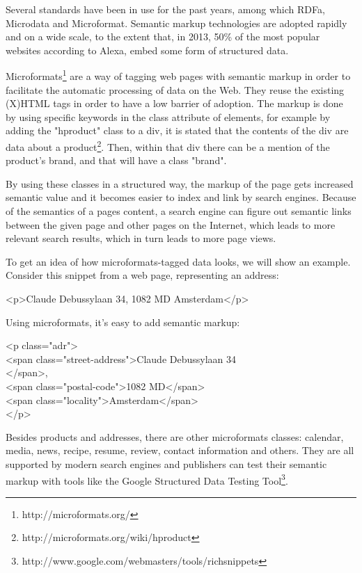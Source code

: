\documentclass{acm_proc_10ptArticle-sp}
\begin{document}
Several standards have been in use for the past years, among which RDFa, Microdata and Microformat\cite{bizer2013deployment}. Semantic markup technologies are adopted rapidly and on a wide scale, to the extent that, in 2013, 50\% of the most popular websites according to Alexa, embed some form of structured data. 

Microformats\footnote{http://microformats.org/} are a way of tagging web pages with semantic markup in order to facilitate the automatic processing of data on the Web. They reuse the existing (X)HTML tags in order to have a low barrier of adoption. The markup is done by using specific keywords in the class attribute of elements, for example by adding the "hproduct" class to a div, it is stated that the contents of the div are data about a product\footnote{http://microformats.org/wiki/hproduct}. Then, within that div there can be a mention of the product's brand, and that will have a class "brand".

By using these classes in a structured way, the markup of the page gets increased semantic value and it becomes easier to index and link by search engines. Because of the semantics of a pages content, a search engine can figure out semantic links between the given page and other pages on the Internet, which leads to more relevant search results, which in turn leads to more page views.

To get an idea of how microformats-tagged data looks, we will show an example. Consider this snippet from a web page, representing an address:

<p>Claude Debussylaan 34, 1082 MD Amsterdam</p>

Using microformats, it's easy to add semantic markup:

<p class="adr">\\
     <span class="street-address">Claude Debussylaan 34\\</span>,\\
     <span class="postal-code">1082 MD</span>\\
     <span class="locality">Amsterdam</span>\\
</p>

Besides products and addresses, there are other microformats classes: calendar, media, news, recipe, resume, review, contact information and others. They are all supported by modern search engines and publishers can test their semantic markup with tools like the Google Structured Data Testing Tool\footnote{http://www.google.com/webmasters/tools/richsnippets}.
\end{document}
